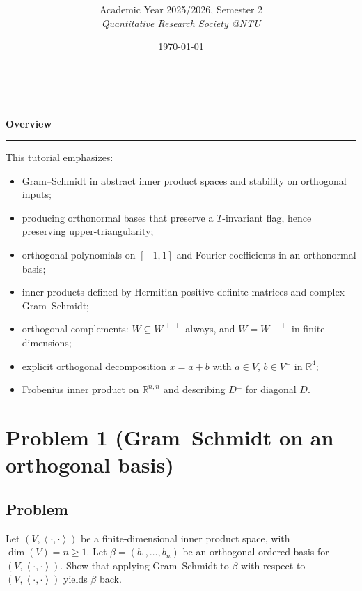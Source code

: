 \documentclass[12pt]{article}
\title{
\CourseCode\ \CourseName \\[0.3em]
\large \DocType
}
\author{
  Academic Year 2025/2026, Semester 2 \\[0.25em]
  \textit{Quantitative Research Society @NTU}
}
\date{\today}
\newcommand{\R}{\mathbb{R}}
\newcommand{\ip}[2]{\left\langle #1,#2\right\rangle}
\begin{document}
\maketitle
\thispagestyle{plainfirst}
\pagestyle{main}

\begin{center}
  \rule{0.8\textwidth}{0.4pt}\\[4pt]
  \textbf{Overview}\\[2pt]
  \rule{0.8\textwidth}{0.4pt}
\end{center}

\noindent
This tutorial emphasizes:
\begin{itemize}[leftmargin=*]
  \item Gram--Schmidt in abstract inner product spaces and stability on orthogonal inputs;
  \item producing orthonormal bases that preserve a $T$-invariant flag, hence preserving upper-triangularity;
  \item orthogonal polynomials on $[-1,1]$ and Fourier coefficients in an orthonormal basis;
  \item inner products defined by Hermitian positive definite matrices and complex Gram--Schmidt;
  \item orthogonal complements: $W\subseteq W^{\perp\perp}$ always, and $W=W^{\perp\perp}$ in finite dimensions;
  \item explicit orthogonal decomposition $x=a+b$ with $a\in V$, $b\in V^\perp$ in $\R^4$;
  \item Frobenius inner product on $\R^{n,n}$ and describing $D^\perp$ for diagonal $D$.
\end{itemize}

\newpage
\tableofcontents
\newpage

\section{Problem 1 (Gram--Schmidt on an orthogonal basis)}
\subsection{Problem}
Let $(V,\ip{\cdot}{\cdot})$ be a finite-dimensional inner product space, with $\dim(V)=n\ge 1$.
Let $\beta=(b_1,\dots,b_n)$ be an orthogonal ordered basis for $(V,\ip{\cdot}{\cdot})$.
Show that applying Gram--Schmidt to $\beta$ with respect to $(V,\ip{\cdot}{\cdot})$ yields $\beta$ back.
\end{document}
